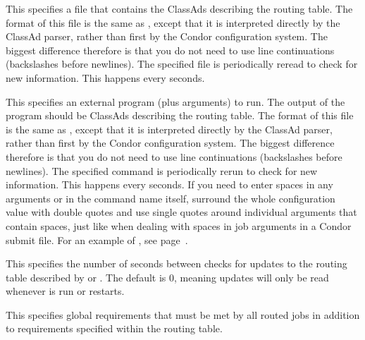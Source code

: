\begin{description}
\begin{description}
\end{description}

\item[\Macro{JOB\_ROUTER\_ENTRIES\_FILE}] \label{param:JobRouterEntriesFile}
This specifies a file that contains the ClassAds describing the
routing table.  The format of this file is the same as
, except that it is interpreted directly
by the ClassAd parser, rather than first by the Condor configuration
system.  The biggest difference therefore is that you do not need to
use line continuations (backslashes before newlines).  The specified
file is periodically reread to check for new information.  This
happens every  seconds.

\item[\Macro{JOB\_ROUTER\_ENTRIES\_CMD}]
\label{param:JobRouterEntriesCmd} This specifies an external program
(plus arguments) to run.  The output of the program should be ClassAds
describing the routing table.  The format of this file is the same as
, except that it is interpreted directly
by the ClassAd parser, rather than first by the Condor configuration
system.  The biggest difference therefore is that you do not need to
use line continuations (backslashes before newlines).  The specified
command is periodically rerun to check for new information.  This
happens every  seconds.  If you
need to enter spaces in any arguments or in the command name itself,
surround the whole configuration value with double quotes and use
single quotes around individual arguments that contain spaces, just
like when dealing with spaces in job arguments in a Condor submit
file.  For an example of , see
page~\pageref{JobRouterReSSExample}.

\item[\Macro{JOB\_ROUTER\_ENTRIES\_REFRESH}]
\label{param:JobRouterEntriesRefresh} This specifies the number of
seconds between checks for updates to the routing table described by
 or
.  The default is 0, meaning updates
will only be read whenever  is run or
 restarts.

\item[\Macro{JOB\_ROUTER\_SOURCE\_JOB\_CONSTRAINT}]
\label{JobRouterSourceJobConstraint} This specifies global
requirements that must be met by all routed jobs in addition to
requirements specified within the routing table.


\end{description}
